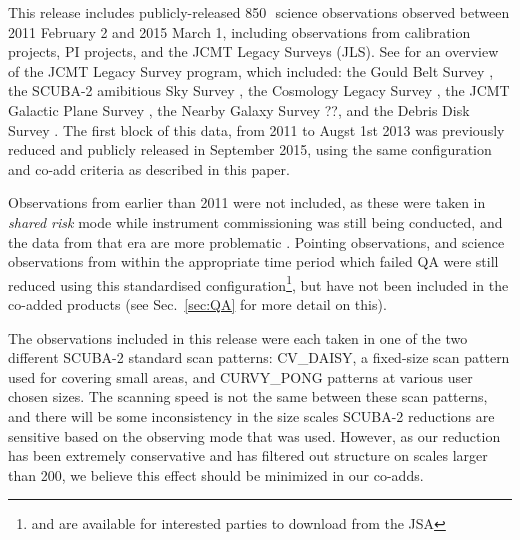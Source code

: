 \documentclass[twocolumn,times]{aastex6}
\newcommand{\um}{\micron}
\newcommand{\sref}[1]{Sec.~\ref{#1}}
\newcommand{\note}[1]{\textcolor{red}{Note: #1}}
\begin{document}
This release includes publicly-released 850\,\um\ science observations
observed between 2011 February 2 and 2015 March 1, including
observations from calibration projects, PI projects, and the JCMT
Legacy Surveys (JLS). See \citealt{ChrysostomouJLS} for an overview of the
JCMT Legacy Survey program, which included: the Gould Belt Survey
\citep{GBS}, the SCUBA-2 amibitious Sky Survey \citep{SASSy}, the
Cosmology Legacy Survey \citep{Geach2013}, the JCMT Galactic Plane Survey
\citep{JPS}, the Nearby Galaxy Survey ??, and the Debris Disk Survey
\citep{SONS}.  The first block of this data, from 2011 to Augst 1st
2013 was previously reduced and publicly released in September 2015,
using the same configuration and co-add criteria as described in this
paper.


Observations from earlier than 2011 were not included, as these were
taken in \emph{shared risk} mode while instrument commissioning was
still being conducted, and the data from that era are more problematic
\citep{SC19,Dempsey2010}. Pointing observations, and science
observations from within the appropriate time period which failed QA
were still reduced using this standardised configuration\footnote{and
  are available for interested parties to download from the JSA}, but
have not been included in the co-added products (see \sref{sec:QA} for
more detail on this).

The observations included in this release were each taken in one of
the two different SCUBA-2 standard scan patterns: CV\_DAISY, a
fixed-size scan pattern used for covering small areas, and CURVY\_PONG
patterns at various user chosen sizes. The scanning speed is not the
same between these scan patterns, and there will be some inconsistency
in the size scales SCUBA-2 reductions are sensitive based on the
observing mode that was used. However, as our reduction has been
extremely conservative and has filtered out structure on scales larger
than 200\arcsec, we believe this effect should be minimized in our
co-adds.
\end{document}
